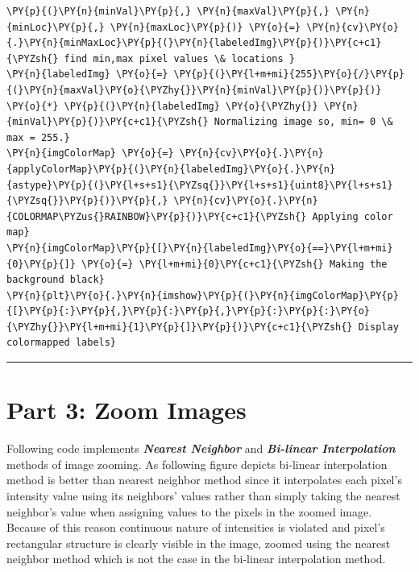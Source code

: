 \documentclass[a4paper,10pt]{article}%
\begin{document}
\begin{tcolorbox}[breakable, size=fbox, boxrule=1pt, pad at break*=1mm,colback=cellbackground, colframe=cellborder]
\begin{Verbatim}[commandchars=\\\{\}]
\PY{p}{(}\PY{n}{minVal}\PY{p}{,} \PY{n}{maxVal}\PY{p}{,} \PY{n}{minLoc}\PY{p}{,} \PY{n}{maxLoc}\PY{p}{)} \PY{o}{=} \PY{n}{cv}\PY{o}{.}\PY{n}{minMaxLoc}\PY{p}{(}\PY{n}{labeledImg}\PY{p}{)}\PY{c+c1}{\PYZsh{} find min,max pixel values \& locations }
\PY{n}{labeledImg} \PY{o}{=} \PY{p}{(}\PY{l+m+mi}{255}\PY{o}{/}\PY{p}{(}\PY{n}{maxVal}\PY{o}{\PYZhy{}}\PY{n}{minVal}\PY{p}{)}\PY{p}{)} \PY{o}{*} \PY{p}{(}\PY{n}{labeledImg} \PY{o}{\PYZhy{}} \PY{n}{minVal}\PY{p}{)}\PY{c+c1}{\PYZsh{} Normalizing image so, min= 0 \& max = 255.}
\PY{n}{imgColorMap} \PY{o}{=} \PY{n}{cv}\PY{o}{.}\PY{n}{applyColorMap}\PY{p}{(}\PY{n}{labeledImg}\PY{o}{.}\PY{n}{astype}\PY{p}{(}\PY{l+s+s1}{\PYZsq{}}\PY{l+s+s1}{uint8}\PY{l+s+s1}{\PYZsq{}}\PY{p}{)}\PY{p}{,} \PY{n}{cv}\PY{o}{.}\PY{n}{COLORMAP\PYZus{}RAINBOW}\PY{p}{)}\PY{c+c1}{\PYZsh{} Applying color map}
\PY{n}{imgColorMap}\PY{p}{[}\PY{n}{labeledImg}\PY{o}{==}\PY{l+m+mi}{0}\PY{p}{]} \PY{o}{=} \PY{l+m+mi}{0}\PY{c+c1}{\PYZsh{} Making the background black}
\PY{n}{plt}\PY{o}{.}\PY{n}{imshow}\PY{p}{(}\PY{n}{imgColorMap}\PY{p}{[}\PY{p}{:}\PY{p}{,}\PY{p}{:}\PY{p}{,}\PY{p}{:}\PY{p}{:}\PY{o}{\PYZhy{}}\PY{l+m+mi}{1}\PY{p}{]}\PY{p}{)}\PY{c+c1}{\PYZsh{} Display colormapped labels}
\end{Verbatim}
\end{tcolorbox}

\vspace{5mm}
\hrule
\section{Part 3: Zoom Images}        

Following code implements \textbf{\textit{Nearest Neighbor}} and \textbf{\textit{Bi-linear Interpolation}}  methods of image zooming. As following figure depicts bi-linear interpolation method is better than nearest neighbor method since it interpolates each pixel's intensity value using its neighbors' values rather than simply taking the nearest neighbor's value when assigning values to the pixels in the zoomed image. Because of this reason continuous nature of intensities is violated  and pixel's rectangular structure is clearly visible in the image, zoomed using the nearest neighbor method which is not the case in the bi-linear interpolation method.
\end{document}
